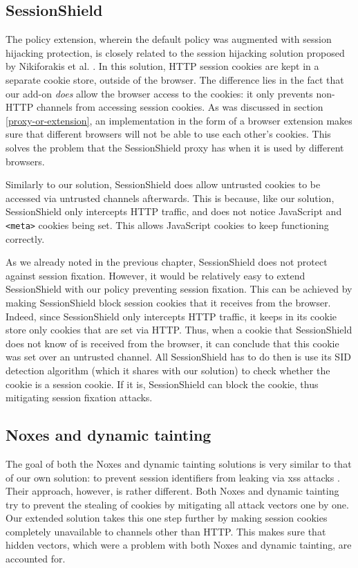 \subsection{SessionShield}\label{sessionshield-comparison}

The policy extension, wherein the default policy was augmented with session hijacking protection, is closely related to the session hijacking solution proposed by Nikiforakis et al. \cite{Nikiforakis2010}. In this solution, HTTP session cookies are kept in a separate cookie store, outside of the browser. The difference lies in the fact that our add-on \emph{does} allow the browser access to the cookies: it only prevents non-HTTP channels from accessing session cookies. As was discussed in section \ref{proxy-or-extension}, an implementation in the form of a browser extension makes sure that different browsers will not be able to use each other's cookies. This solves the problem that the SessionShield proxy has when it is used by different browsers.

Similarly to our solution, SessionShield does allow untrusted cookies to be accessed via untrusted channels afterwards. This is because, like our solution, SessionShield only intercepts HTTP traffic, and does not notice JavaScript and \texttt{<meta>} cookies being set. This allows JavaScript cookies to keep functioning correctly.

As we already noted in the previous chapter, SessionShield does not protect against session fixation. However, it would be relatively easy to extend SessionShield with our policy preventing session fixation. This can be achieved by making SessionShield block session cookies that it receives from the browser. Indeed, since SessionShield only intercepts HTTP traffic, it keeps in its cookie store only cookies that are set via HTTP. Thus, when a cookie that SessionShield does not know of is received from the browser, it can conclude that this cookie was set over an untrusted channel. All SessionShield has to do then is use its SID detection algorithm (which it shares with our solution) to check whether the cookie is a session cookie. If it is, SessionShield can block the cookie, thus mitigating session fixation attacks.

\subsection{Noxes and dynamic tainting}

The goal of both the Noxes and dynamic tainting solutions is very similar to that of our own solution: to prevent session identifiers from leaking via \gls{xss} attacks \cite{Kirda2006,Vogt2007}. Their approach, however, is rather different. Both Noxes and dynamic tainting try to prevent the stealing of cookies by mitigating all attack vectors one by one. Our extended solution takes this one step further by making session cookies completely unavailable to channels other than HTTP. This makes sure that hidden vectors, which were a problem with both Noxes and dynamic tainting, are accounted for.

